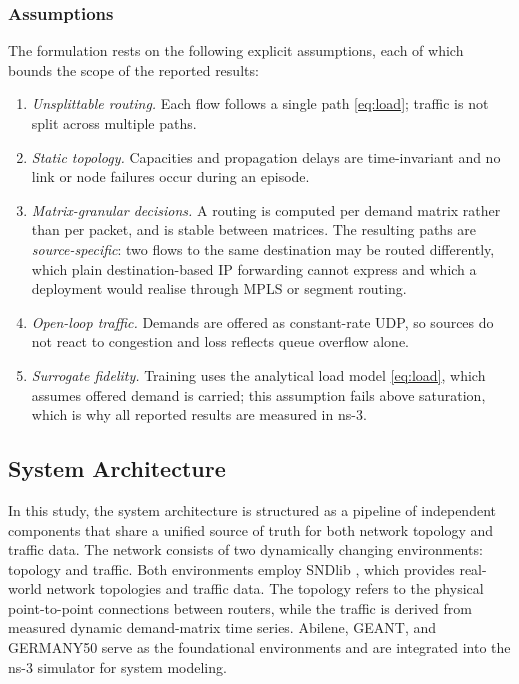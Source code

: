 \subsubsection{Assumptions}
The formulation rests on the following explicit assumptions, each of which
bounds the scope of the reported results:
\begin{enumerate}
\item \emph{Unsplittable routing.} Each flow follows a single path
\eqref{eq:load}; traffic is not split across multiple paths.
\item \emph{Static topology.} Capacities and propagation delays are
time-invariant and no link or node failures occur during an episode.
\item \emph{Matrix-granular decisions.} A routing is computed per demand matrix
rather than per packet, and is stable between matrices. The resulting paths are
\emph{source-specific}: two flows to the same destination may be routed
differently, which plain destination-based IP forwarding cannot express and which
a deployment would realise through MPLS or segment routing.
\item \emph{Open-loop traffic.} Demands are offered as constant-rate UDP, so
sources do not react to congestion and loss reflects queue overflow alone.
\item \emph{Surrogate fidelity.} Training uses the analytical load model
\eqref{eq:load}, which assumes offered demand is carried; this assumption fails
above saturation, which is why all reported results are measured in ns-3.
\end{enumerate}

\subsection{System Architecture}
In this study, the system architecture is structured as a pipeline of independent components that share a unified source of truth for both network topology and traffic data. The network consists of two dynamically changing environments: topology and traffic. Both environments employ SNDlib \cite{SNDlib10} \cite{OrlowskiPioroTomaszewskiWessaely2010}, which provides real-world network topologies and traffic data. The topology refers to the physical point-to-point connections between routers, while the traffic is derived from measured dynamic demand-matrix time series. Abilene, GEANT, and GERMANY50 serve as the foundational environments and are integrated into the ns-3 simulator for system modeling.

